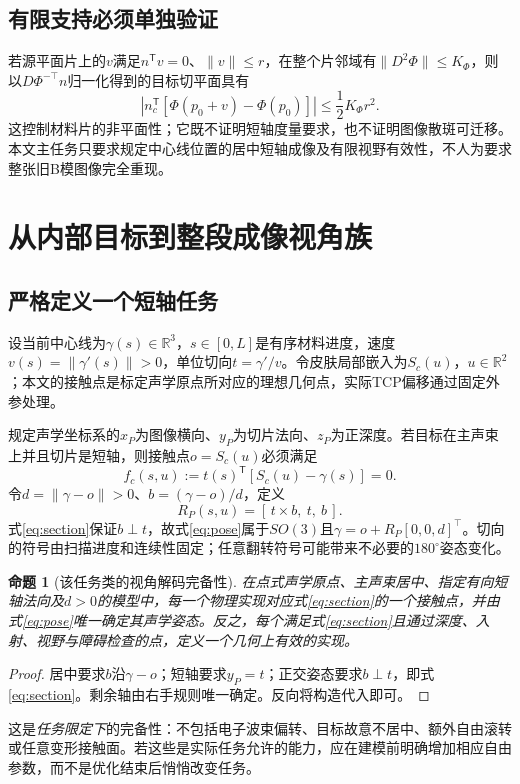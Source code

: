 \documentclass[UTF8,11pt,a4paper,fontset=fandol]{ctexart}
\numberwithin{equation}{section}
\newtheorem{proposition}[theorem]{命题}
\theoremstyle{definition}
\newcommand{\R}{\mathbb R}
\newcommand{\T}{^{\mathsf T}}
\begin{document}
\subsection{有限支持必须单独验证}
若源平面片上的$v$满足$n\T v=0$、$\|v\|\le r$，在整个片邻域有$\|D^2\Phi\|\le K_\Phi$，则以$D\Phi^{-\top}n$归一化得到的目标切平面具有
\begin{equation}
\left|n_c\T[\Phi(p_0+v)-\Phi(p_0)]\right|\le\frac12K_\Phi r^2.
\end{equation}
这控制材料片的非平面性；它既不证明短轴度量要求，也不证明图像散斑可迁移。本文主任务只要求规定中心线位置的居中短轴成像及有限视野有效性，不人为要求整张旧B模图像完全重现。

\section{从内部目标到整段成像视角族}
\subsection{严格定义一个短轴任务}
设当前中心线为$\gamma(s)\in\R^3$，$s\in[0,L]$是有序材料进度，速度$v(s)=\|\gamma'(s)\|>0$，单位切向$t=\gamma'/v$。令皮肤局部嵌入为$S_c(u)$，$u\in\R^2$；本文的接触点是标定声学原点所对应的理想几何点，实际TCP偏移通过固定外参处理。

规定声学坐标系的$x_P$为图像横向、$y_P$为切片法向、$z_P$为正深度。若目标在主声束上并且切片是短轴，则接触点$o=S_c(u)$必须满足
\begin{equation}
 \boxed{f_c(s,u):=t(s)\T[S_c(u)-\gamma(s)]=0.}
 \label{eq:section}
\end{equation}
令$d=\|\gamma-o\|>0$、$b=(\gamma-o)/d$，定义
\begin{equation}
 \boxed{R_P(s,u)=[\,t\times b,\ t,\ b\,].}
 \label{eq:pose}
\end{equation}
式\eqref{eq:section}保证$b\perp t$，故式\eqref{eq:pose}属于$SO(3)$且$\gamma=o+R_P[0,0,d]^\top$。切向的符号由扫描进度和连续性固定；任意翻转符号可能带来不必要的$180^\circ$姿态变化。

\begin{proposition}[该任务类的视角解码完备性]
在点式声学原点、主声束居中、指定有向短轴法向及$d>0$的模型中，每一个物理实现对应式\eqref{eq:section}的一个接触点，并由式\eqref{eq:pose}唯一确定其声学姿态。反之，每个满足式\eqref{eq:section}且通过深度、入射、视野与障碍检查的点，定义一个几何上有效的实现。
\end{proposition}
\begin{proof}
居中要求$b$沿$\gamma-o$；短轴要求$y_P=t$；正交姿态要求$b\perp t$，即式\eqref{eq:section}。剩余轴由右手规则唯一确定。反向将构造代入即可。
\end{proof}
这是\emph{任务限定下}的完备性：不包括电子波束偏转、目标故意不居中、额外自由滚转或任意变形接触面。若这些是实际任务允许的能力，应在建模前明确增加相应自由参数，而不是优化结束后悄悄改变任务。
\end{document}

